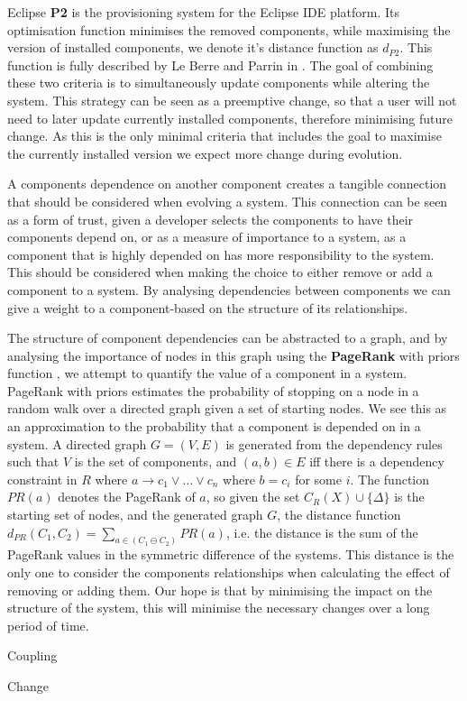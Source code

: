 Eclipse \textbf{P2} \cite{le_berre_dependency_2009,leBerre2010} is the provisioning system for the Eclipse IDE platform.
Its optimisation function minimises the removed components, while maximising the version of installed components, 
we denote it's distance function as $d_{P2}$.
This function is fully described by Le Berre and Parrin in \cite{leBerre2010}.
The goal of combining these two criteria is to simultaneously update components while altering the system.
This strategy can be seen as a preemptive change, so that a user will not need to later update currently installed components,
therefore minimising future change.
As this is the only minimal criteria that includes the goal to maximise the currently installed version 
we expect more change during evolution.

A components dependence on another component creates a tangible connection that should be considered when evolving a system.
This connection can be seen as a form of trust, given a developer selects the components to have their components depend on,
or as a measure of importance to a system, as a component that is highly depended on has more responsibility to the system.
This should be considered when making the choice to either remove or add a component to a system.
By analysing dependencies between components we can give a weight to a component-based on the structure of its relationships.

The structure of component dependencies can be abstracted to a graph, 
and by analysing the importance of nodes in this graph using the \textbf{PageRank} with priors function \cite{White:2003:AER:956750.956782}, 
we attempt to quantify the value of a component in a system.
PageRank with priors estimates the probability of stopping on a node in a random walk over a directed graph given a set of starting nodes.
We see this as an approximation to the probability that a component is depended on in a system.
A directed graph $G = (V,E)$ is generated from the
dependency rules such that $V$ is the set of components, and $(a,b) \in E$ iff there is a dependency constraint in $R$ 
where $a \rightarrow c_1 \vee \ldots \vee c_n$ where $b = c_i$ for some $i$.
The function $PR(a)$ denotes the PageRank of $a$,
so given the set $C_R(X) \cup \{\Delta\}$ is the starting set of nodes, and the generated graph $G$,
the distance function $d_{PR}(C_1,C_2) = \sum_{a \in (C_1 \ominus C_2)} PR(a)$,
i.e. the distance is the sum of the PageRank values in the symmetric difference of the systems.
This distance is the only one to consider the components relationships when calculating the effect of removing or adding them.
Our hope is that by minimising the impact on the structure of the system, 
this will minimise the necessary changes over a long period of time.

Coupling

Change